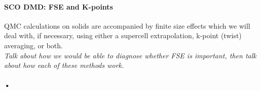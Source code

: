 \documentclass{article}
\begin{document}
\paragraph{SCO DMD:  FSE and K-points} QMC calculations on solids are accompanied by finite size effects which we will deal with, if necessary, using either a supercell extrapolation, k-point (twist) averaging, or both.
\\
\textit{Talk about how we would be able to diagnose whether FSE is important, then talk about how each of these methods work.}
 
 \paragraph{•}
\end{document}
